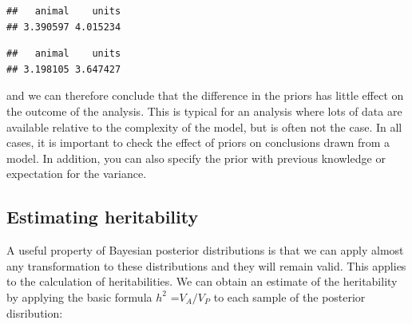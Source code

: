 \documentclass[
  12pt,
]{book}
\newenvironment{Shaded}{\begin{snugshade}}{\end{snugshade}}
\newcommand{\FloatTok}[1]{\textcolor[rgb]{0.00,0.00,0.81}{#1}}
\newcommand{\KeywordTok}[1]{\textcolor[rgb]{0.13,0.29,0.53}{\textbf{#1}}}
\newcommand{\NormalTok}[1]{#1}
\newcommand{\OperatorTok}[1]{\textcolor[rgb]{0.81,0.36,0.00}{\textbf{#1}}}
\newcommand{\StringTok}[1]{\textcolor[rgb]{0.31,0.60,0.02}{#1}}
\begin{document}
\begin{verbatim}
##   animal    units 
## 3.390597 4.015234
\end{verbatim}

\begin{Shaded}
\end{Shaded}

\begin{verbatim}
##   animal    units 
## 3.198105 3.647427
\end{verbatim}

and we can therefore conclude that the difference in the priors has little effect on the outcome of the analysis. This is typical for an analysis where lots of data are available relative to the complexity of the model, but is often not the case. In all cases, it is important to check the effect of priors on conclusions drawn from a model. In addition, you can also specify the prior with previous knowledge or expectation for the variance.

\hypertarget{estimating-heritability-1}{%
\subsection{Estimating heritability}\label{estimating-heritability-1}}

A useful property of Bayesian posterior distributions is that we can apply almost any transformation to these distributions and they will remain valid. This applies to the calculation of heritabilities. We can obtain an estimate of the heritability by applying the basic formula \(h^2\) =\(V_A /V_P\) to each sample of the posterior disribution:

\begin{Shaded}
\end{Shaded}
\end{document}
